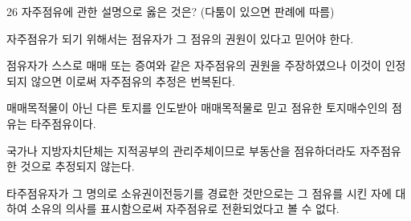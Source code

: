 \begin{question}{26}
자주점유에 관한 설명으로 옳은 것은? (다툼이 있으면 판례에 따름)
\begin{choices}
  \item 자주점유가 되기 위해서는 점유자가 그 점유의 권원이 있다고 믿어야 한다.
  \item 점유자가 스스로 매매 또는 증여와 같은 자주점유의 권원을 주장하였으나 이것이 인정되지 않으면 이로써 자주점유의 추정은 번복된다.
  \item 매매목적물이 아닌 다른 토지를 인도받아 매매목적물로 믿고 점유한 토지매수인의 점유는 타주점유이다.
  \item 국가나 지방자치단체는 지적공부의 관리주체이므로 부동산을 점유하더라도 자주점유한 것으로 추정되지 않는다.
  \item 타주점유자가 그 명의로 소유권이전등기를 경료한 것만으로는 그 점유를 시킨 자에 대하여 소유의 의사를 표시함으로써 자주점유로 전환되었다고 볼 수 없다.
\end{choices}
\end{question}
